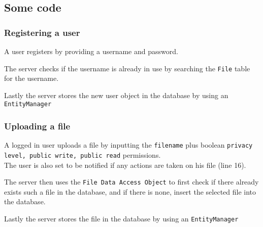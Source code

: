 \documentclass[a4paper]{scrartcl}
\begin{document}
\subsection{Some code}
\subsubsection{Registering a user}
A user registers by providing a username and password.

The server checks if the username is already in use by searching the \texttt{File} table for the username.

Lastly the server stores the new user object in the database by using an \texttt{EntityManager}


\subsubsection{Uploading a file}
A logged in user uploads a file by inputting the \texttt{filename} plus boolean \texttt{privacy level, public write, public read} permissions.\\
The user is also set to be notified if any actions are taken on his file (line 16).

The server then uses the \texttt{File Data Access Object} to first check if there already exists such a file in the database, and if there is none, insert the selected file into the database.

Lastly the server stores the file in the database by using an \texttt{EntityManager}

\end{document}
